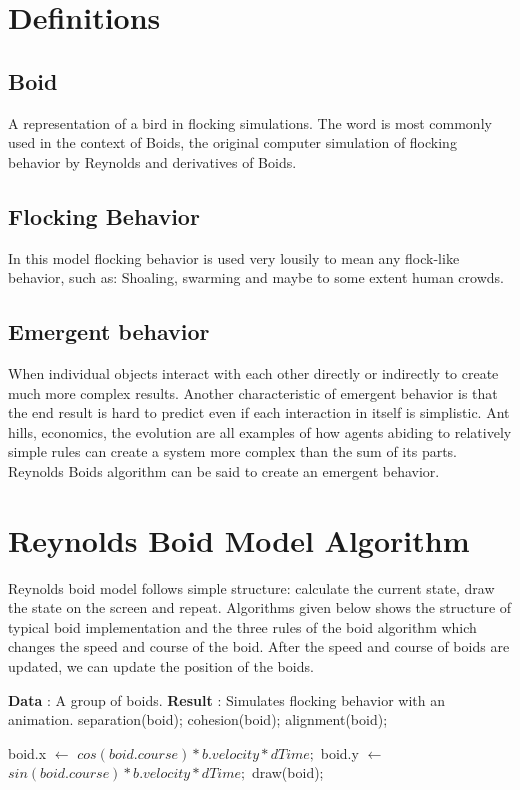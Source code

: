\documentclass[a4paper]{article}
\begin{document}
\section{Definitions}
\label{sec:theory}

\subsection{Boid}
A representation of a bird in flocking simulations. The word is most commonly used in the context of Boids, the original computer simulation of flocking behavior by
Reynolds and derivatives of Boids.

\subsection{Flocking Behavior}
In this model flocking behavior is used very lousily to mean any flock-like behavior, such as: Shoaling, swarming and maybe to some extent human crowds.

\subsection{Emergent behavior}
When individual objects interact with each other directly or indirectly to create much more complex results. Another characteristic of emergent behavior is that the end result is hard to predict even if each interaction in itself is simplistic. Ant hills, economics, the evolution are all examples of how agents abiding to relatively simple rules can create a system more complex than the sum of its parts. Reynolds
Boids algorithm can be said to create an emergent behavior.


\section{Reynolds Boid Model Algorithm}
Reynolds boid model follows simple structure: calculate the current state, draw the state on the screen and repeat. Algorithms given below shows the structure of typical boid implementation and the three rules of the boid algorithm which changes the speed and course of the boid. After the speed and course of boids are updated, we can update the position of the boids.

\begin{algorithm}
\begin{algorithmic}
\State \textbf{Data} : A group of boids.
\State \textbf{Result} : Simulates flocking behavior with an animation.
    	\State separation(boid);
        \State cohesion(boid);
        \State alignment(boid);
    \EndFor
    
    	 \State boid.x $\gets$ $cos(boid.course) * b.velocity * dTime;$
    	 \State boid.y $\gets$ $sin(boid.course) * b.velocity * dTime;$
         \State draw(boid);
    \EndFor
\EndFor 
\end{algorithmic}
\end{algorithm}
\end{document}
